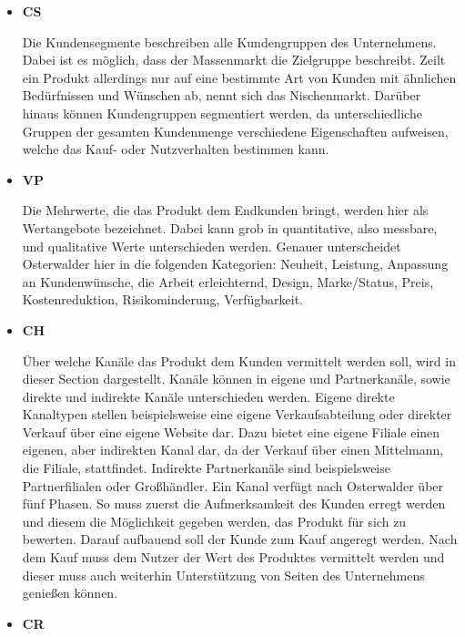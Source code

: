 \begin{itemize}
	\item \textbf{\ac{CS}}
	
	Die Kundensegmente beschreiben alle Kundengruppen des Unternehmens. Dabei ist es möglich, dass der Massenmarkt die Zielgruppe beschreibt. Zeilt ein Produkt allerdings nur auf eine bestimmte Art von Kunden mit ähnlichen Bedürfnissen und Wünschen ab, nennt sich das Nischenmarkt. Darüber hinaus können Kundengruppen segmentiert werden, da unterschiedliche Gruppen der gesamten Kundenmenge verschiedene Eigenschaften aufweisen, welche das Kauf- oder Nutzverhalten bestimmen kann. 
	
	\item \textbf{\ac{VP}}
	
	Die Mehrwerte, die das Produkt dem Endkunden bringt, werden hier als Wertangebote bezeichnet. Dabei kann grob in quantitative, also messbare, und qualitative Werte unterschieden werden. Genauer unterscheidet Osterwalder hier in die folgenden Kategorien: Neuheit, Leistung, Anpassung an Kundenwünsche, die Arbeit erleichternd, Design, Marke/Status, Preis, Kostenreduktion, Risikominderung, Verfügbarkeit.
	
	\item \textbf{\ac{CH}}
	
	Über welche Kanäle das Produkt dem Kunden vermittelt werden soll, wird in dieser Section dargestellt. Kanäle können in eigene und Partnerkanäle, sowie direkte und indirekte Kanäle unterschieden werden. Eigene direkte Kanaltypen stellen beispielsweise eine eigene Verkaufsabteilung oder direkter Verkauf über eine eigene Website dar. Dazu bietet eine eigene Filiale einen eigenen, aber indirekten Kanal dar, da der Verkauf über einen Mittelmann, die Filiale, stattfindet. Indirekte Partnerkanäle sind beispielsweise Partnerfilialen oder Großhändler. Ein Kanal verfügt nach Osterwalder über fünf Phasen. So muss zuerst die Aufmerksamkeit des Kunden erregt werden und diesem die Möglichkeit gegeben werden, das Produkt für sich zu bewerten. Darauf aufbauend soll der Kunde zum Kauf angeregt werden. Nach dem Kauf muss dem Nutzer der Wert des Produktes vermittelt werden und dieser muss auch weiterhin Unterstützung von Seiten des Unternehmens genießen können.
	
	\item \textbf{\ac{CR}}
	

\end{itemize}
